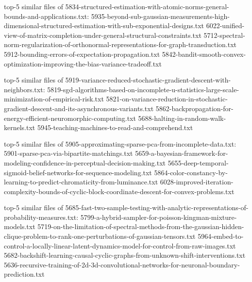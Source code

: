 \documentclass[11pt]{article}
\begin{document}
top-5 similar files of
5834-structured-estimation-with-atomic-norms-general-bounds-and-applications.txt:
5935-beyond-sub-gaussian-measurements-high-dimensional-structured-estimation-with-sub-exponential-designs.txt
6022-unified-view-of-matrix-completion-under-general-structural-constraints.txt
5712-spectral-norm-regularization-of-orthonormal-representations-for-graph-transduction.txt
5912-bounding-errors-of-expectation-propagation.txt
5842-bandit-smooth-convex-optimization-improving-the-bias-variance-tradeoff.txt

top-5 similar files of
5919-variance-reduced-stochastic-gradient-descent-with-neighbors.txt:
5819-sgd-algorithms-based-on-incomplete-u-statistics-large-scale-minimization-of-empirical-risk.txt
5821-on-variance-reduction-in-stochastic-gradient-descent-and-its-asynchronous-variants.txt
5862-backpropagation-for-energy-efficient-neuromorphic-computing.txt
5688-halting-in-random-walk-kernels.txt
5945-teaching-machines-to-read-and-comprehend.txt

top-5 similar files of
5905-approximating-sparse-pca-from-incomplete-data.txt:
5901-sparse-pca-via-bipartite-matchings.txt
5659-a-bayesian-framework-for-modeling-confidence-in-perceptual-decision-making.txt
5655-deep-temporal-sigmoid-belief-networks-for-sequence-modeling.txt
5864-color-constancy-by-learning-to-predict-chromaticity-from-luminance.txt
6028-improved-iteration-complexity-bounds-of-cyclic-block-coordinate-descent-for-convex-problems.txt

top-5 similar files of
5685-fast-two-sample-testing-with-analytic-representations-of-probability-measures.txt:
5799-a-hybrid-sampler-for-poisson-kingman-mixture-models.txt
5719-on-the-limitation-of-spectral-methods-from-the-gaussian-hidden-clique-problem-to-rank-one-perturbations-of-gaussian-tensors.txt
5964-embed-to-control-a-locally-linear-latent-dynamics-model-for-control-from-raw-images.txt
5682-backshift-learning-causal-cyclic-graphs-from-unknown-shift-interventions.txt
5636-recursive-training-of-2d-3d-convolutional-networks-for-neuronal-boundary-prediction.txt


    
    
    
    
\end{document}

